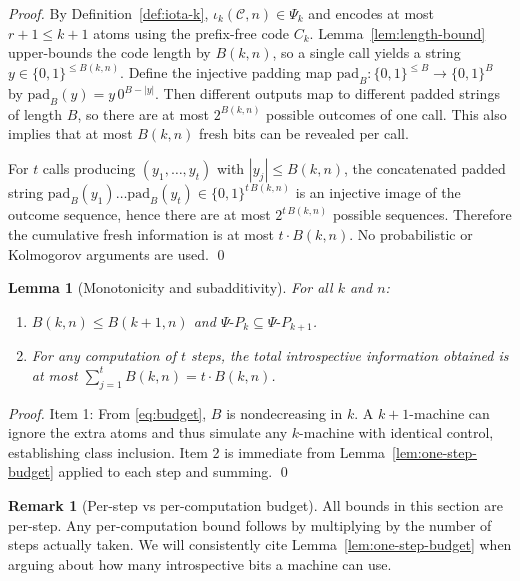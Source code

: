 \documentclass[11pt]{article}
\newtheorem{lemma}[theorem]{Lemma}
\theoremstyle{definition}
\newtheorem{remark}[theorem]{Remark}
\newcommand{\PSi}{\Psi}
\newcommand{\bits}{\{0,1\}}
\begin{document}
\begin{proof}
By Definition~\ref{def:iota-k}, $\iota_k(\mathcal{C},n)\in\PSi_k$ and encodes at most $r+1\le k+1$ atoms using the prefix-free code $C_k$. Lemma~\ref{lem:length-bound} upper-bounds the code length by $B(k,n)$, so a single call yields a string $y\in\bits^{\le B(k,n)}$. Define the injective padding map $\mathrm{pad}_B: \bits^{\le B}\to\bits^{B}$ by $\mathrm{pad}_B(y)=y\,0^{B-|y|}$. Then different outputs map to different padded strings of length $B$, so there are at most $2^{B(k,n)}$ possible outcomes of one call. This also implies that at most $B(k,n)$ fresh bits can be revealed per call.

For $t$ calls producing $(y_1,\ldots,y_t)$ with $|y_j|\le B(k,n)$, the concatenated padded string $\mathrm{pad}_B(y_1)\ldots\mathrm{pad}_B(y_t)\in\bits^{t\,B(k,n)}$ is an injective image of the outcome sequence, hence there are at most $2^{t\,B(k,n)}$ possible sequences. Therefore the cumulative fresh information is at most $t\cdot B(k,n)$. No probabilistic or Kolmogorov arguments are used. \qed
\end{proof}

\begin{lemma}[Monotonicity and subadditivity]
\label{lem:monotone}
For all $k$ and $n$:
\begin{enumerate}
  \item $B(k,n)\le B(k+1,n)$ and $\PSi\text{-}P_k\subseteq \PSi\text{-}P_{k+1}$.
  \item For any computation of $t$ steps, the total introspective information obtained is at most $\sum_{j=1}^{t} B(k,n) = t\cdot B(k,n)$.
\end{enumerate}
\end{lemma}

\begin{proof}
Item 1: From \eqref{eq:budget}, $B$ is nondecreasing in $k$. A $k{+}1$-machine can ignore the extra atoms and thus simulate any $k$-machine with identical control, establishing class inclusion. Item 2 is immediate from Lemma~\ref{lem:one-step-budget} applied to each step and summing. \qed
\end{proof}

\begin{remark}[Per-step vs per-computation budget]
All bounds in this section are per-step. Any per-computation bound follows by multiplying by the number of steps actually taken. We will consistently cite Lemma~\ref{lem:one-step-budget} when arguing about how many introspective bits a machine can use.
\end{remark}
\end{document}
